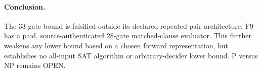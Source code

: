 \documentclass[11pt]{article}
\begin{document}
\paragraph{Conclusion.}
The 33-gate bound is falsified outside its declared repeated-pair architecture; F9 has a
paid, source-authenticated 28-gate matched-clause evaluator.  This further weakens any lower
bound based on a chosen forward representation, but establishes no all-input SAT algorithm
or arbitrary-decider lower bound.  P versus NP remains OPEN.
\end{document}
